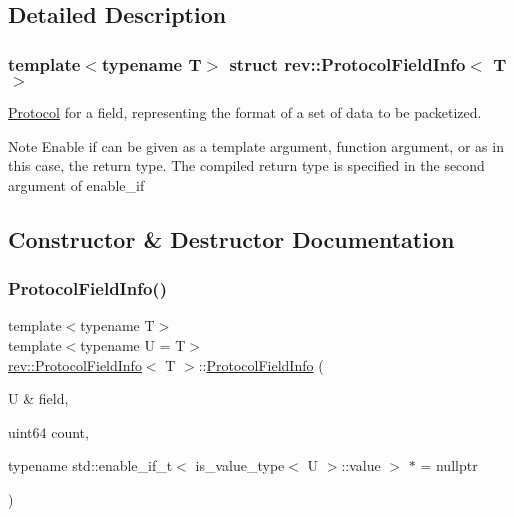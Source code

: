 \subsection{Detailed Description}
\subsubsection*{template$<$typename T$>$\newline
struct rev\+::\+Protocol\+Field\+Info$<$ T $>$}

\mbox{\hyperlink{classrev_1_1_protocol}{Protocol}} for a field, representing the format of a set of data to be packetized. 

\begin{DoxyNote}{Note}
Enable if can be given as a template argument, function argument, or as in this case, the return type. The compiled return type is specified in the second argument of enable\+\_\+if 
\end{DoxyNote}


\subsection{Constructor \& Destructor Documentation}
\mbox{\label{structrev_1_1_protocol_field_info_aca2badda599387af7b120d02573f6b12}} 
\subsubsection{\texorpdfstring{ProtocolFieldInfo()}{ProtocolFieldInfo()}\hspace{0.1cm}{\footnotesize\ttfamily [1/3]}}
{\footnotesize\ttfamily template$<$typename T$>$ \\
template$<$typename U  = T$>$ \\
\mbox{\hyperlink{structrev_1_1_protocol_field_info}{rev\+::\+Protocol\+Field\+Info}}$<$ T $>$\+::\mbox{\hyperlink{structrev_1_1_protocol_field_info}{Protocol\+Field\+Info}} (\begin{DoxyParamCaption}\item[{U \&}]{field,  }\item[{uint64}]{count,  }\item[{typename std\+::enable\+\_\+if\+\_\+t$<$ is\+\_\+value\+\_\+type$<$ U $>$\+::value $>$ $\ast$}]{ = {\ttfamily nullptr} }\end{DoxyParamCaption})\hspace{0.3cm}{\ttfamily [inline]}}



